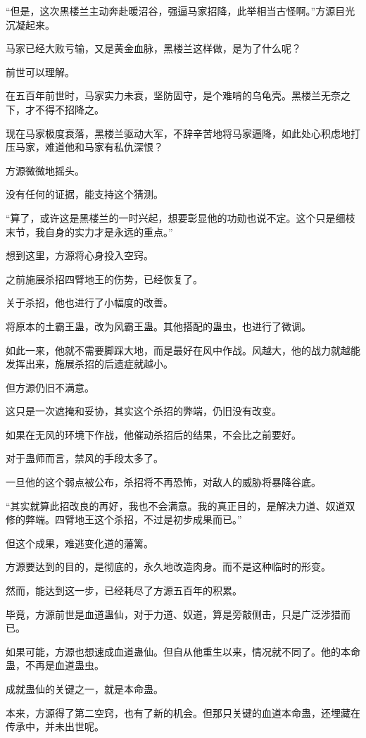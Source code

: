 \begin{this_body}
“但是，这次黑楼兰主动奔赴暖沼谷，强逼马家招降，此举相当古怪啊。”方源目光沉凝起来。

马家已经大败亏输，又是黄金血脉，黑楼兰这样做，是为了什么呢？

前世可以理解。

在五百年前世时，马家实力未衰，坚防固守，是个难啃的乌龟壳。黑楼兰无奈之下，才不得不招降之。

现在马家极度衰落，黑楼兰驱动大军，不辞辛苦地将马家逼降，如此处心积虑地打压马家，难道他和马家有私仇深恨？

方源微微地摇头。

没有任何的证据，能支持这个猜测。

“算了，或许这是黑楼兰的一时兴起，想要彰显他的功勋也说不定。这个只是细枝末节，我自身的实力才是永远的重点。”

想到这里，方源将心身投入空窍。

之前施展杀招四臂地王的伤势，已经恢复了。

关于杀招，他也进行了小幅度的改善。

将原本的土霸王蛊，改为风霸王蛊。其他搭配的蛊虫，也进行了微调。

如此一来，他就不需要脚踩大地，而是最好在风中作战。风越大，他的战力就越能发挥出来，施展杀招的后遗症就越小。

但方源仍旧不满意。

这只是一次遮掩和妥协，其实这个杀招的弊端，仍旧没有改变。

如果在无风的环境下作战，他催动杀招后的结果，不会比之前要好。

对于蛊师而言，禁风的手段太多了。

一旦他的这个弱点被公布，杀招将不再恐怖，对敌人的威胁将暴降谷底。

“其实就算此招改良的再好，我也不会满意。我的真正目的，是解决力道、奴道双修的弊端。四臂地王这个杀招，不过是初步成果而已。”

但这个成果，难逃变化道的藩篱。

方源要达到的目的，是彻底的，永久地改造肉身。而不是这种临时的形变。

然而，能达到这一步，已经耗尽了方源五百年的积累。

毕竟，方源前世是血道蛊仙，对于力道、奴道，算是旁敲侧击，只是广泛涉猎而已。

如果可能，方源也想速成血道蛊仙。但自从他重生以来，情况就不同了。他的本命蛊，不再是血道蛊虫。

成就蛊仙的关键之一，就是本命蛊。

本来，方源得了第二空窍，也有了新的机会。但那只关键的血道本命蛊，还埋藏在传承中，并未出世呢。


\end{this_body}
